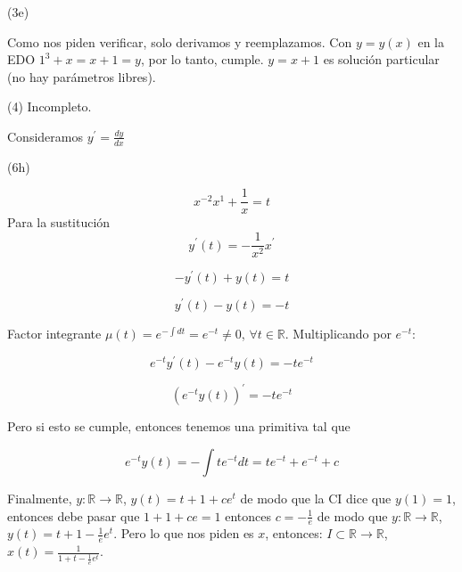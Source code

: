 \begin{exercise}
(3e)

Como nos piden verificar, solo derivamos y reemplazamos. Con $y = y(x)$ en la EDO $1^3 + x = x + 1 = y$, por lo tanto, cumple.
$y = x + 1$ es soluci\'on particular (no hay par\'ametros libres).

\end{exercise}

\begin{exercise}
(4) Incompleto.

Consideramos $y^{\prime} = \frac{dy}{dx}$

\end{exercise}

\begin{exercise}

(6h)

$$
x^{-2}x^1 + \frac{1}{x} = t
$$
Para la sustituci\'on
$$
y^{\prime}(t) = -\frac{1}{x^2}x^{\prime}
$$

$$
-y^{\prime}(t) + y(t) = t
$$

$$
y^{\prime}(t) - y(t) = -t
$$

Factor integrante $\mu(t)=e^{-\int dt}  =e^{-t} \neq 0$, $\forall t \in  \mathbb{R}$. Multiplicando por $e^{-t}$:

$$
e^{-t}y^{\prime}(t) - e^{-t}y(t) = -te^{-t}
$$

$$
(e^{-t}y(t))^{\prime} = -te^{-t}
$$

Pero si esto se cumple, entonces tenemos una primitiva tal que

$$
e^{-t}y(t) = -\int te^{-t}dt = t e^{-t} + e^{-t} + c
$$

Finalmente, $y: \mathbb{R} \rightarrow \mathbb{R}$, $y(t) = t + 1 + ce^t$ de modo que la CI dice que $y(1) = 1$, entonces debe pasar que $1 + 1 + ce = 1$ entonces $c = -\frac{1}{e}$ de modo que $y: \mathbb{R} \rightarrow \mathbb{R}$, $y(t) = t + 1 - \frac{1}{e}e^t$. Pero lo que nos piden es $x$, entonces:
$I \subset \mathbb{R} \rightarrow \mathbb{R}$, $x(t) = \frac{1}{1 + t - \frac{1}{e}e^t}$.

\end{exercise}

